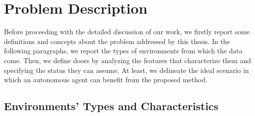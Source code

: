 \section{Problem Description}

Before proceeding with the detailed discussion of our work, we firstly report some definitions and concepts about the problem addressed by this thesis. In the following paragraphs, we report the types of environments from which the data come. Then, we define doors by analyzing the features that characterize them and specifying the status they can assume. At least, we delineate the ideal scenario in which an autonomous agent can benefit from the proposed method.

\subsection{Environments' Types and Characteristics}


